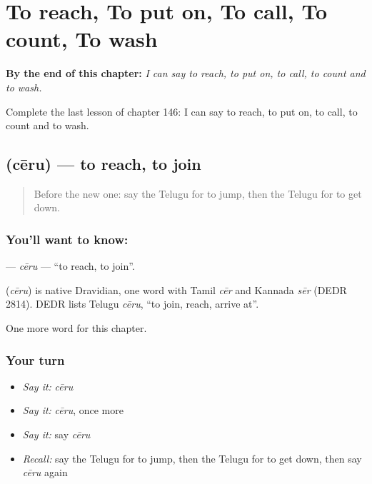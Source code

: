 
\chapter{To reach, To put on, To call, To count, To wash}
\label{ch:te-to-reach-to-put-on-to-call-to-count-to-wash}

\begin{chapteropening}
\textbf{By the end of this chapter:} \emph{I can say to reach, to put on, to call, to count and to wash.}

Complete the last lesson of chapter 146: I can say to reach, to put on, to call, to count and to wash.
\end{chapteropening}

\section[\texorpdfstring{\te{చేరు} (cēru)}{చేరు (cēru)}]{ (cēru) — to reach, to join}

\label{lesson:TE-C146-ceru}



\begin{quote}
Before the new one: say the Telugu for to jump, then the Telugu for to get down.
\end{quote}

\subsection*{You'll want to know: }
\textbf{} — \emph{cēru} — \textquotedblleft{}to reach, to join\textquotedblright{}.

\begin{cousinweb}
\textbf{} (\emph{cēru}) is native Dravidian, one word with Tamil \emph{cēr} and Kannada \emph{sēr} (DEDR 2814). DEDR lists Telugu \emph{cēru}, \textquotedblleft{}to join, reach, arrive at\textquotedblright{}.
\end{cousinweb}

\begin{grammarlens}[title={What you've built}]
One more word for this chapter.
\end{grammarlens}

\subsection*{Your turn}
\begin{itemize}
\raggedright
  \item \emph{Say it:} \emph{cēru}
  \item \emph{Say it:} \emph{cēru}, once more
  \item \emph{Say it:} say \emph{cēru}
  \item \emph{Recall:} say the Telugu for to jump, then the Telugu for to get down, then say \emph{cēru} again
\end{itemize}

